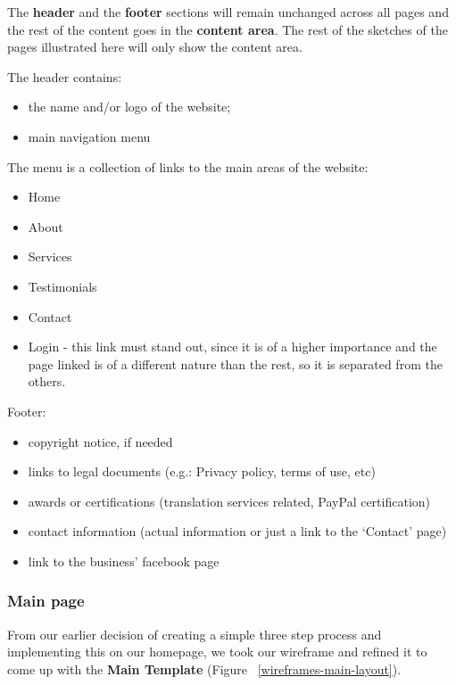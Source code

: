 \documentclass{l3proj}
\begin{document}
The \textbf{header} and the \textbf{footer} sections will remain unchanged
across all pages and the rest of the content goes in the \textbf{content area}.
The rest of the sketches of the pages illustrated here will only show the
content area.

The header contains:
\begin{itemize} \itemsep1pt \parskip0pt 
	\item the name and/or logo of the website;
	\item main navigation menu
\end{itemize}

The menu is a collection of links to the main areas of the website:
\begin{itemize} \itemsep1pt \parskip0pt 
	\item Home
	\item About
	\item Services
	\item Testimonials
	\item Contact
	\item Login - this link must stand out, since it is of a higher
	importance and the page linked is of a different nature than the rest,
	so it is separated from the others.
\end{itemize}


Footer:
\begin{itemize} \itemsep1pt \parskip0pt 
	\item copyright notice, if needed
	\item links to legal documents (e.g.: Privacy policy, terms of use, etc)
	\item awards or certifications (translation services related, 
	PayPal certification)
	\item contact information (actual information or just a link to the 
	`Contact’ page)
	\item link to the business’ facebook page
\end{itemize}


\subsubsection{Main page}
From our earlier decision of creating a simple three step process and
implementing this on our homepage, we took our wireframe and refined it to
come up with the  \textbf{Main Template} (Figure ~\ref{wireframes-main-layout}).
\end{document}
